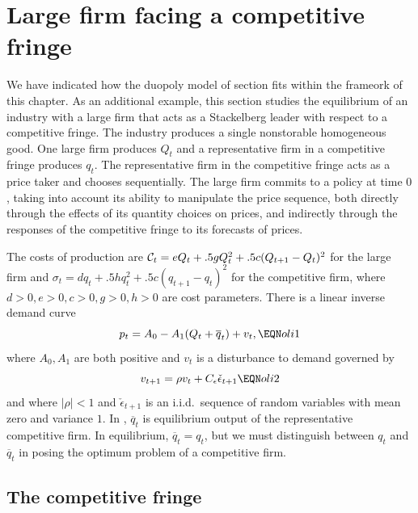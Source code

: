 \section{Large firm facing a competitive fringe}\label{sec:monopfringe}%
We have indicated how the duopoly model of section  fits within the  frameork of this chapter.
As an additional example, this section studies the equilibrium of an industry with
a large firm that acts as a Stackelberg leader with respect to a competitive
fringe.%
  The industry produces a single nonstorable homogeneous good. One
large firm produces $Q_t$ and a representative firm in a competitive
fringe produces $q_t$.  The representative firm in the competitive
fringe acts as a price taker and chooses sequentially.  The large firm
commits to a policy at time $0$, taking into account its ability to
manipulate the price sequence, both directly through the effects of
its quantity choices on prices, and indirectly through the responses of
the competitive fringe to its forecasts of prices.

  The costs of production are
${\cal C}_t = e Q_t + .5 g Q_t^2+ .5 c (Q_{t+1} - Q_{t})^2 $
for the large firm
and $ \sigma_t= d q_t + .5 h q_t^2 + .5 c (q_{t+1} - q_t)^2$
for the competitive firm,
where $d>0, e >0, c>0, g >0, h>0 $ are cost parameters.
There is a linear inverse demand curve
$$ p_t = A_0 - A_1 (Q_t + \overline q_t) + v_t, \EQN oli1 $$
where $A_0, A_1$ are both positive and  $v_t$ is a disturbance
to demand governed by
$$ v_{t+1}= \rho v_t + C_\epsilon \check \epsilon_{t+1} \EQN oli2 $$
and where $ | \rho | < 1$ and $\check \epsilon_{t+1}$ is an i.i.d.\
sequence of random variables with mean zero and variance $1$.
In , $\overline q_t$ is equilibrium output  of the representative
competitive firm.  In equilibrium, $\overline q_t = q_t$, but we
must distinguish between $q_t$ and $\overline q_t$ in posing the optimum
problem of a competitive firm.

\subsection{The competitive fringe}

